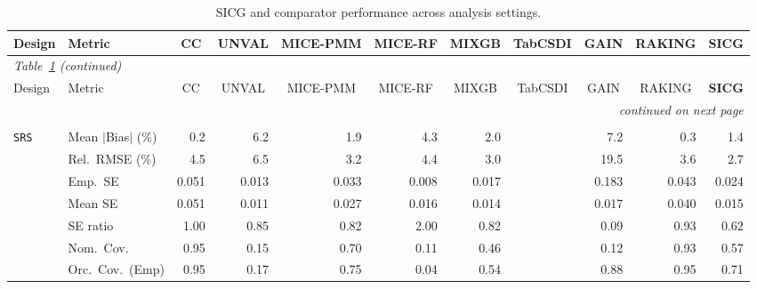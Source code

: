 \begin{landscape}
\footnotesize\setlength{\tabcolsep}{3.5pt}
\begin{longtable}{llrrrrrrrrr}
\caption{SICG and comparator performance across analysis settings.}
\label{tab:appc_surv_SampleE} \\
\toprule
Design & Metric & \multicolumn{1}{c}{CC} & \multicolumn{1}{c}{UNVAL} & \multicolumn{1}{c}{MICE-PMM} & \multicolumn{1}{c}{MICE-RF} & \multicolumn{1}{c}{MIXGB} & \multicolumn{1}{c}{TabCSDI} & \multicolumn{1}{c}{GAIN} & \multicolumn{1}{c}{RAKING} & \multicolumn{1}{c}{\textbf{SICG}} \\
\midrule \endfirsthead
\multicolumn{11}{l}{\footnotesize\itshape Table~\ref{tab:appc_surv_SampleE} (continued)} \\
\toprule
Design & Metric & \multicolumn{1}{c}{CC} & \multicolumn{1}{c}{UNVAL} & \multicolumn{1}{c}{MICE-PMM} & \multicolumn{1}{c}{MICE-RF} & \multicolumn{1}{c}{MIXGB} & \multicolumn{1}{c}{TabCSDI} & \multicolumn{1}{c}{GAIN} & \multicolumn{1}{c}{RAKING} & \multicolumn{1}{c}{\textbf{SICG}} \\
\midrule \endhead
\midrule \multicolumn{11}{r}{\footnotesize\itshape continued on next page} \\
\endfoot
\bottomrule \endlastfoot
\multicolumn{11}{l}{\textbf{Continuous Phase-Two Covariates}} \\
\addlinespace[2pt]
\quad \texttt{SRS} & Mean $|$Bias$|$ (\%) & \cellcolor{rankone}0.2 & 6.2 & 1.9 & 4.3 & 2.0 &  & 7.2 & \cellcolor{ranktwo}0.3 & \cellcolor{rankthree}1.4 \\
 & Rel.\ RMSE (\%) & 4.5 & 6.5 & \cellcolor{rankthree}3.2 & 4.4 & \cellcolor{ranktwo}3.0 &  & 19.5 & 3.6 & \cellcolor{rankone}2.7 \\
 & Emp.\ SE & 0.051 & 0.013 & 0.033 & 0.008 & 0.017 &  & 0.183 & 0.043 & 0.024 \\
 & Mean SE & 0.051 & 0.011 & 0.027 & 0.016 & 0.014 &  & 0.017 & 0.040 & 0.015 \\
 & SE ratio & \cellcolor{rankone}1.00 & \cellcolor{rankthree}0.85 & 0.82 & 2.00 & 0.82 &  & 0.09 & \cellcolor{ranktwo}0.93 & 0.62 \\
 & Nom.\ Cov. & \cellcolor{rankone}0.95 & 0.15 & \cellcolor{rankthree}0.70 & 0.11 & 0.46 &  & 0.12 & \cellcolor{ranktwo}0.93 & 0.57 \\
 & Orc.\ Cov.\ (Emp) & \cellcolor{rankone}0.95 & 0.17 & \cellcolor{rankthree}0.75 & 0.04 & 0.54 &  & \cellcolor{ranktwo}0.88 & \cellcolor{rankone}0.95 & 0.71 \\

\end{longtable}
\end{landscape}
